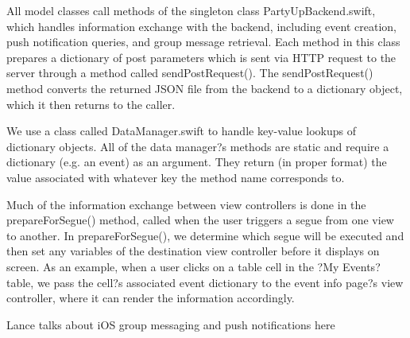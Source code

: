 \documentclass[12pt]{article}
\begin{document}
All model classes call methods of the singleton class PartyUpBackend.swift, which handles information exchange with the backend, including event creation, push notification queries, and group message retrieval. Each method in this class prepares a dictionary of post parameters which is sent via HTTP request to the server through a method called sendPostRequest(). The sendPostRequest() method converts the returned JSON file from the backend to a dictionary object, which it then returns to the caller.

We use a class called DataManager.swift to handle key-value lookups of dictionary objects. All of the data manager?s methods are static and require a dictionary (e.g. an event) as an argument. They return (in proper format) the value associated with whatever key the method name corresponds to. 

Much of the information exchange between view controllers is done in the prepareForSegue() method, called when the user triggers a segue from one view to another. In prepareForSegue(), we determine which segue will be executed and then set any variables of the destination view controller before it displays on screen. As an example, when a user clicks on a table cell in the ?My Events? table, we pass the cell?s associated event dictionary to the event info page?s view controller, where it can render the information accordingly. 

Lance talks about iOS group messaging and push notifications here
\end{document}
